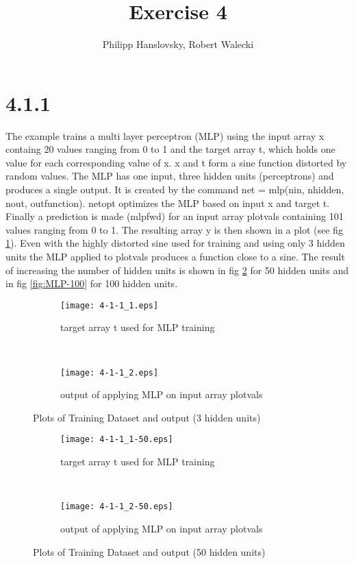 \documentclass[a4paper,11pt]{article}
\title{Exercise 4}
\author{Philipp Hanslovsky, Robert Walecki}
\theoremstyle{definition}
\theoremstyle{plain}
\theoremstyle{remark}
\begin{document}
\maketitle

\section*{4.1.1}


The example trains a multi layer perceptron (MLP) using the input array x containg 20 values ranging from 0 to 1 and the target array t, which holds one value for each corresponding value of x. x and t form a sine function distorted by random values. The MLP has one input, three hidden units (perceptrons) and produces a single output. It is created by the command net = mlp(nin, nhidden, nout, outfunction). netopt optimizes the MLP based on input x and target t. Finally a prediction is made (mlpfwd) for an input array plotvals containing 101 values ranging from 0 to 1. The resulting array y is then shown in a plot (see fig \ref{fig:MLP}). Even with the highly distorted sine used for training and using only 3 hidden units the MLP applied to plotvals produces a function close to a sine. The result of increasing the number of hidden units is shown in fig \ref{fig:MLP-50} for 50 hidden units and in fig \ref{fig:MLP-100} for 100 hidden units.


\begin{figure}
\centering
\begin{subfigure}[b]{0.45\textwidth}
\centering
\texttt{[image: 4-1-1\_1.eps]}
\caption{target array t used for MLP training}
\end{subfigure}
~
\begin{subfigure}[b]{0.45\textwidth}
\centering
\texttt{[image: 4-1-1\_2.eps]}
\caption{output of applying MLP on input array plotvals}
\end{subfigure}


\caption{Plots of Training Dataset and output (3 hidden units)}
\label{fig:MLP}
\end{figure}


\begin{figure}
\centering
\begin{subfigure}[b]{0.45\textwidth}
\centering
\texttt{[image: 4-1-1\_1-50.eps]}
\caption{target array t used for MLP training}
\end{subfigure}
~
\begin{subfigure}[b]{0.45\textwidth}
\centering
\texttt{[image: 4-1-1\_2-50.eps]}
\caption{output of applying MLP on input array plotvals}
\end{subfigure}


\caption{Plots of Training Dataset and output (50 hidden units)}
\label{fig:MLP-50}
\end{figure}
\end{document}
